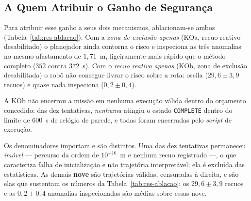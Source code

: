 \subsection{A Quem Atribuir o Ganho de Segurança}
\label{sec:res-ablacao}

Para atribuir esse ganho a seus dois mecanismos, ablacionam-se ambos
(Tabela~\ref{tab:res-ablacao}). Com a \emph{zona de exclusão apenas} (KOa, recuo
reativo desabilitado) o planejador ainda contorna o risco e inspeciona as três
anomalias no mesmo afastamento de $1{,}71$~m, ligeiramente mais rápido que o método
completo ($352$ contra $372$~s). Com o \emph{recuo reativo apenas} (KOb, zona de
exclusão desabilitada) o robô não consegue livrar o risco sobre a rota: oscila
($29{,}6\pm3{,}9$ recuos) e quase nada inspeciona ($0{,}2\pm0{,}4$).

A KOb não encerrou a missão em nenhuma execução válida dentro do orçamento concedido:
das dez tentativas, \emph{nenhuma} atingiu o estado \texttt{COMPLETE} dentro do limite
de $600$~s de relógio de parede, e todas foram encerradas pelo \textit{script} de
execução.

Os denominadores importam e são distintos. Uma das dez tentativas permaneceu
\emph{imóvel} --- percurso da ordem de $10^{-16}$~m e nenhum recuo registrado ---, o
que caracteriza falha de inicialização e não trajetória interpretável; ela é excluída
das estatísticas. As demais \textbf{nove} são trajetórias válidas, censuradas à
direita, e são elas que sustentam os números da Tabela~\ref{tab:res-ablacao}: os
$29{,}6\pm3{,}9$ recuos e as $0{,}2\pm0{,}4$ anomalias inspecionadas são médias sobre
essas nove.


